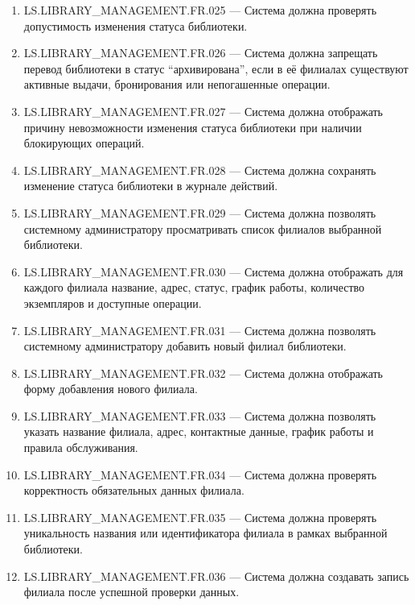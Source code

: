 \documentclass[12pt,a4paper]{article}
\begin{document}
\begin{enumerate}
		\item LS.LIBRARY\_MANAGEMENT.FR.025 --- Система должна проверять допустимость
		изменения статуса библиотеки.
		
		\item LS.LIBRARY\_MANAGEMENT.FR.026 --- Система должна запрещать перевод библиотеки
		в статус ``архивирована'', если в её филиалах существуют активные выдачи,
		бронирования или непогашенные операции.
		
		\item LS.LIBRARY\_MANAGEMENT.FR.027 --- Система должна отображать причину
		невозможности изменения статуса библиотеки при наличии блокирующих операций.
		
		\item LS.LIBRARY\_MANAGEMENT.FR.028 --- Система должна сохранять изменение статуса
		библиотеки в журнале действий.
		
		\item LS.LIBRARY\_MANAGEMENT.FR.029 --- Система должна позволять системному
		администратору просматривать список филиалов выбранной библиотеки.
		
		\item LS.LIBRARY\_MANAGEMENT.FR.030 --- Система должна отображать для каждого
		филиала название, адрес, статус, график работы, количество экземпляров и доступные
		операции.
		
		\item LS.LIBRARY\_MANAGEMENT.FR.031 --- Система должна позволять системному
		администратору добавить новый филиал библиотеки.
		
		\item LS.LIBRARY\_MANAGEMENT.FR.032 --- Система должна отображать форму добавления
		нового филиала.
		
		\item LS.LIBRARY\_MANAGEMENT.FR.033 --- Система должна позволять указать название
		филиала, адрес, контактные данные, график работы и правила обслуживания.
		
		\item LS.LIBRARY\_MANAGEMENT.FR.034 --- Система должна проверять корректность
		обязательных данных филиала.
		
		\item LS.LIBRARY\_MANAGEMENT.FR.035 --- Система должна проверять уникальность
		названия или идентификатора филиала в рамках выбранной библиотеки.
		
		\item LS.LIBRARY\_MANAGEMENT.FR.036 --- Система должна создавать запись филиала
		после успешной проверки данных.
		

\end{enumerate}
\end{document}

